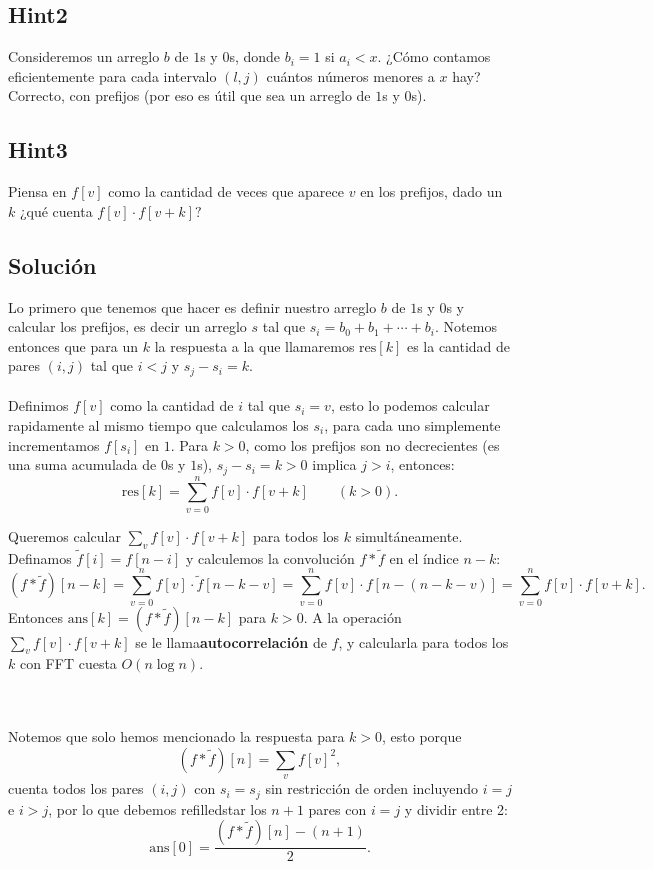 \subsection*{Hint2}
Consideremos un arreglo $b$ de $1$s y $0$s, donde $b_i=1$ si $a_i < x$. ¿Cómo contamos eficientemente para cada intervalo $(l,j)$ cuántos números menores a $x$ hay? Correcto, con prefijos (por eso es útil que sea un arreglo de $1$s y $0$s).
\subsection*{Hint3}
Piensa en $f[v]$ como la cantidad de veces que aparece $v$ en los prefijos, dado un $k$ ¿qué cuenta $f[v] \cdot  f[v+k]?$
\subsection*{Solución}
Lo primero que tenemos que hacer es definir nuestro arreglo $b$ de $1$s y $0$s y calcular los prefijos, es decir un arreglo $s$ tal que $s_i=b_0+b_1+\cdots+b_i$. Notemos entonces que para un $k$ la respuesta a la que llamaremos $\text{res}[k]$ es la cantidad de pares $(i,j)$ tal que $i < j$ y $s_j-s_i=k$.
\\\\
Definimos $f[v]$ como la cantidad de $i$ tal que $s_i=v$, esto lo podemos calcular rapidamente al mismo tiempo que calculamos los $s_i$, para cada uno simplemente incrementamos $f[s_i]$ en $1$. Para $k>0$, como los prefijos son no decrecientes (es una suma acumulada de $0$s y $1$s), $s_j - s_i = k > 0$ implica $j > i$, entonces:
\[
\text{res}[k] = \sum_{v=0}^{n} f[v] \cdot f[v+k] \qquad (k > 0).
\]
\begin{samepage}
Queremos calcular $\sum_v f[v] \cdot f[v+k]$ para todos los $k$ simultáneamente. Definamos $\tilde{f}[i] = f[n-i]$ y calculemos la convolución $f * \tilde{f}$ en el índice $n-k$:
\[
(f * \tilde{f})[n-k]
= \sum_{v=0}^{n} f[v] \cdot \tilde{f}[n-k-v]
= \sum_{v=0}^{n} f[v] \cdot f[n-(n-k-v)]
= \sum_{v=0}^{n} f[v] \cdot f[v+k].
\]
Entonces $\text{ans}[k] = (f * \tilde{f})[n-k]$ para $k > 0$. A la operación $\sum_v f[v] \cdot f[v+k]$ se le llama\textbf{autocorrelación} de $f$, y calcularla para todos los $k$
con FFT cuesta $O(n \log n)$.
\end{samepage}
\\\\Notemos que solo hemos mencionado la respuesta para $k>0$, esto porque
\[(f * \tilde{f})[n] = \sum_v f[v]^2,\]
cuenta todos los pares $(i,j)$ con $s_i = s_j$ sin restricción de orden incluyendo $i=j$ e $i>j$, por lo que debemos refilledstar los $n+1$ pares con $i=j$ y dividir entre 2:
\[
\text{ans}[0] = \frac{(f * \tilde{f})[n] - (n+1)}{2}.
\]
